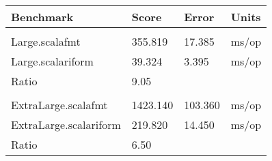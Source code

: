 \begin{tabular}{llll}
  Benchmark              &     Score &     Error &  Units\\
  \hline
  \hline
  \\
  Large.scalafmt         &   355.819 &  17.385  &  ms/op\\
  Large.scalariform      &    39.324 &    3.395 &  ms/op\\
\hline
  Ratio            &   9.05   &  & \\
  \\
  ExtraLarge.scalafmt    &  1423.140 &  103.360 &  ms/op\\
  ExtraLarge.scalariform &   219.820 &   14.450 &  ms/op\\
\hline
  Ratio            &   6.50   &  &
\end{tabular}
